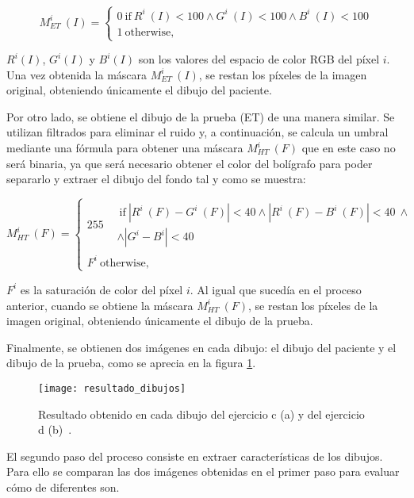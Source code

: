 \begin{equation}
	M^{i}_{ET}\ (I) = \left\lbrace\begin{array}{ll}
0~\text{if}~R^{i}~(I)<100\wedge G^{i}~(I)<100\wedge B^{i}~(I)<100 \\ 1~\text{otherwise,} \end{array}\right.
\end{equation}

\(R^{i}(I)\), \(G^{i}(I)\) y \(B^{i}(I)\) son los valores del espacio de color RGB del píxel \(i\). Una vez obtenida la máscara \(M^{i}_{ET}\ (I)\), se restan los píxeles de la imagen original, obteniendo únicamente el dibujo del paciente.

Por otro lado, se obtiene el dibujo de la prueba (ET) de una manera similar. Se utilizan filtrados para eliminar el ruido y, a continuación, se calcula un umbral mediante una fórmula para obtener una máscara \(M^{i}_{HT}\ (F)\) que en este caso no será binaria, ya que será necesario obtener el color del bolígrafo para poder separarlo y extraer el dibujo del fondo tal y como se muestra:
 
\begin{equation}
	M^{i}_{HT}\ (F) = \left\lbrace\begin{array}{ll}
		255\begin{split}&~\text{if}~|R^{i}~(F)-G^{i}~(F)|<40\wedge |R^{i}~(F)-B^{i}~(F)|<40~\wedge \\ & \wedge|G^{i}-B^{i}|<40 \end{split} \\ F^i~\text{otherwise,} \end{array}\right.
\end{equation}

\(F^{i}\) es la saturación de color del píxel \(i\). Al igual que sucedía en el proceso anterior, cuando se  obtiene la máscara \(M^{i}_{HT}\ (F)\), se restan los píxeles de la imagen original, obteniendo únicamente el dibujo de la prueba.

Finalmente, se obtienen dos imágenes en cada dibujo: el dibujo del paciente y el dibujo de la prueba, como se aprecia en la figura \ref{fig:resultado}.

\begin{figure}[ht]
	\texttt{[image: resultado\_dibujos]}
	\caption{Resultado obtenido en cada dibujo del ejercicio c (a) y del ejercicio d (b)~\cite{pereira2016new}.}
	\label{fig:resultado}
\end{figure}

El segundo paso del proceso consiste en extraer características de los dibujos. Para ello se comparan las dos imágenes obtenidas en el primer paso para evaluar cómo de diferentes son. 

